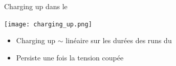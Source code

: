 
   \begin{frame}{Charging up dans le \TOO{}}
        \begin{scriptsize}
            \texttt{[image: charging\_up.png]}
            \begin{itemize}
                \item Charging up $\sim$ linéaire sur les durées des runs du \TOO{}
                \item Persiste une fois la tension coupée
            \end{itemize}
        \end{scriptsize}
    \end{frame}

